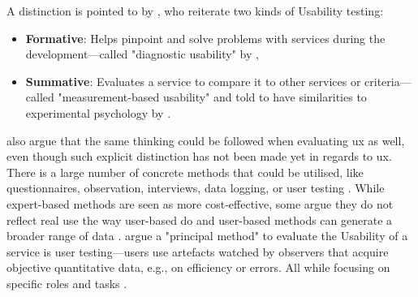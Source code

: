 A distinction is pointed to by \textcite{Juergen_et_all_2020}, who reiterate two kinds of Usability testing:

\begin{itemize}
    \item \textbf{Formative}: Helps pinpoint and solve problems with services during the development---called "diagnostic usability" by \textcite{Lewis_2014},
    \item \textbf{Summative}: Evaluates a service to compare it to other services or criteria---called "measurement-based usability" and told to have similarities to experimental psychology by \textcite{Lewis_2014}.
\end{itemize}

\textcite{Juergen_et_all_2020} also argue that the same thinking could be followed when evaluating \gls{ux} as well, even though such explicit distinction has not been made yet in regards to \gls{ux}.
There is a large number of concrete methods that could be utilised, like questionnaires, observation, interviews, data logging, or user testing \parencite{Juergen_et_all_2020}.
While expert-based methods are seen as more cost-effective, some argue they do not reflect real use the way user-based do and user-based methods can generate a broader range of data \parencite{Juergen_et_all_2020}.
\textcite{Juergen_et_all_2020} argue a "principal method" to evaluate the Usability of a service is user testing---users use artefacts watched by observers that acquire objective quantitative data, e.g., on efficiency or errors.
All while focusing on specific roles and tasks \parencite{Wegge_Zimmermann_2007,McCloskey_2014}.

